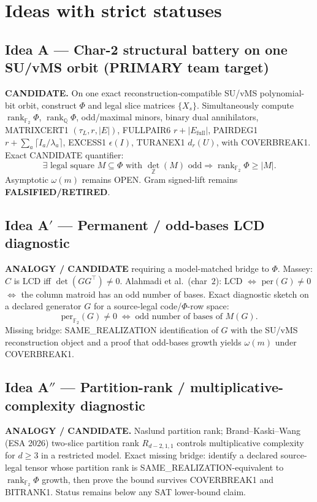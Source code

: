 \documentclass[11pt]{article}
\begin{document}
\section*{Ideas with strict statuses}
\subsection*{Idea A --- Char-2 structural battery on one SU/vMS orbit (PRIMARY team target)}
\textbf{CANDIDATE.} On one exact reconstruction-compatible SU/vMS polynomial-bit
orbit, construct $\Phi$ and legal slice matrices $\{X_s\}$. Simultaneously compute
$\operatorname{rank}_{\mathbb F_2}\Phi$, $\operatorname{rank}_{\mathbb Q}\Phi$,
odd/maximal minors, binary dual annihilators, MATRIXCERT1 $(\tau_L,r,|E|)$,
FULLPAIR6 $r+|E_{\mathrm{full}}|$, PAIRDEG1 $r+\sum_a\lceil I_a/\lambda_a\rceil$,
EXCESS1 $\epsilon(I)$, TURANEX1 $d_r(U)$, with COVERBREAK1. Exact CANDIDATE
quantifier:
\[
\exists\text{ legal square }M\subseteq\Phi\text{ with }\det_{\mathbb Z}(M)\text{ odd}
\Rightarrow\operatorname{rank}_{\mathbb F_2}\Phi\ge|M|.
\]
Asymptotic $\omega(m)$ remains OPEN. Gram signed-lift remains
\textbf{FALSIFIED/RETIRED}.

\subsection*{Idea A$'$ --- Permanent / odd-bases LCD diagnostic}
\textbf{ANALOGY / CANDIDATE} requiring a model-matched bridge to $\Phi$. Massey:
$C$ is LCD iff $\det(GG^\top)\neq 0$. Alahmadi et al.\ (char~$2$): LCD
$\Leftrightarrow$ $\mathrm{per}(G)\neq 0$ $\Leftrightarrow$ the column matroid has
an odd number of bases. Exact diagnostic sketch on a declared generator $G$ for a
source-legal code/$\Phi$-row space:
\[
\mathrm{per}_{\mathbb F_2}(G)\neq 0\;\Leftrightarrow\;\text{odd number of bases of }M(G).
\]
Missing bridge: SAME\_REALIZATION identification of $G$ with the SU/vMS
reconstruction object and a proof that odd-bases growth yields $\omega(m)$ under
COVERBREAK1.

\subsection*{Idea A$''$ --- Partition-rank / multiplicative-complexity diagnostic}
\textbf{ANALOGY / CANDIDATE.} Naslund partition rank; Brand--Kaski--Wang (ESA 2026)
two-slice partition rank $R_{d-2,1,1}$ controls multiplicative complexity for
$d\ge 3$ in a restricted model. Exact missing bridge: identify a declared
source-legal tensor whose partition rank is SAME\_REALIZATION-equivalent to
$\operatorname{rank}_{\mathbb F_2}\Phi$ growth, then prove the bound survives
COVERBREAK1 and BITRANK1. Status remains below any SAT lower-bound claim.
\end{document}
